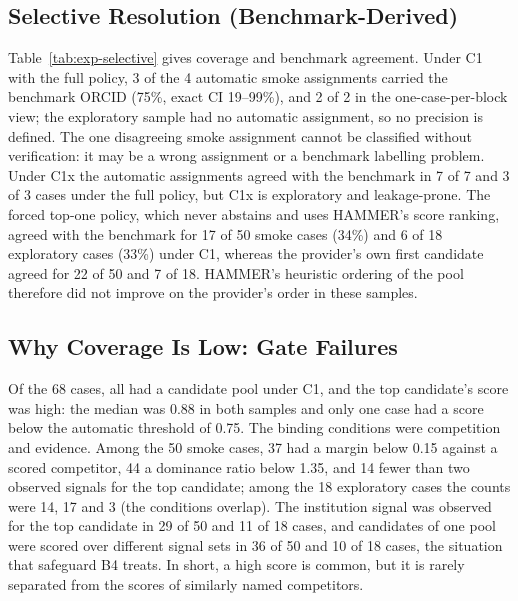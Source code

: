\subsection{Selective Resolution (Benchmark-Derived)}
\label{sec:res-selective}

Table~\ref{tab:exp-selective} gives coverage and benchmark agreement. Under C1 with the full policy, 3 of the 4 automatic smoke assignments carried the benchmark ORCID (75\%, exact CI 19--99\%), and 2 of 2 in the one-case-per-block view; the exploratory sample had no automatic assignment, so no precision is defined. The one disagreeing smoke assignment cannot be classified without verification: it may be a wrong assignment or a benchmark labelling problem. Under C1x the automatic assignments agreed with the benchmark in 7 of 7 and 3 of 3 cases under the full policy, but C1x is exploratory and leakage-prone. The forced top-one policy, which never abstains and uses HAMMER's score ranking, agreed with the benchmark for 17 of 50 smoke cases (34\%) and 6 of 18 exploratory cases (33\%) under C1, whereas the provider's own first candidate agreed for 22 of 50 and 7 of 18. HAMMER's heuristic ordering of the pool therefore did not improve on the provider's order in these samples.

\subsection{Why Coverage Is Low: Gate Failures}
\label{sec:res-gates}
Of the 68 cases, all had a candidate pool under C1, and the top candidate's score was high: the median was 0.88 in both samples and only one case had a score below the automatic threshold of 0.75. The binding conditions were competition and evidence. Among the 50 smoke cases, 37 had a margin below 0.15 against a scored competitor, 44 a dominance ratio below 1.35, and 14 fewer than two observed signals for the top candidate; among the 18 exploratory cases the counts were 14, 17 and 3 (the conditions overlap). The institution signal was observed for the top candidate in 29 of 50 and 11 of 18 cases, and candidates of one pool were scored over different signal sets in 36 of 50 and 10 of 18 cases, the situation that safeguard B4 treats. In short, a high score is common, but it is rarely separated from the scores of similarly named competitors.

